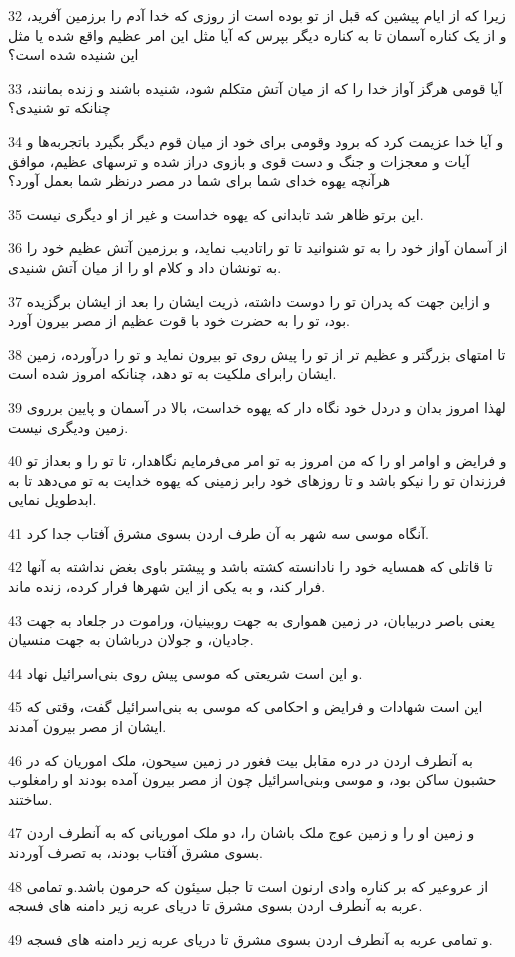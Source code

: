 \par 32 زیرا که از ایام پیشین که قبل از تو بوده است از روزی که خدا آدم را برزمین آفرید، و از یک کناره آسمان تا به کناره دیگر بپرس که آیا مثل این امر عظیم واقع شده یا مثل این شنیده شده است؟
\par 33 آیا قومی هرگز آواز خدا را که از میان آتش متکلم شود، شنیده باشند و زنده بمانند، چنانکه تو شنیدی؟
\par 34 و آیا خدا عزیمت کرد که برود وقومی برای خود از میان قوم دیگر بگیرد باتجربه‌ها و آیات و معجزات و جنگ و دست قوی و بازوی دراز شده و ترسهای عظیم، موافق هرآنچه یهوه خدای شما برای شما در مصر درنظر شما بعمل آورد؟
\par 35 این برتو ظاهر شد تابدانی که یهوه خداست و غیر از او دیگری نیست.
\par 36 از آسمان آواز خود را به تو شنوانید تا تو راتادیب نماید، و برزمین آتش عظیم خود را به تونشان داد و کلام او را از میان آتش شنیدی.
\par 37 و ازاین جهت که پدران تو را دوست داشته، ذریت ایشان را بعد از ایشان برگزیده بود، تو را به حضرت خود با قوت عظیم از مصر بیرون آورد.
\par 38 تا امتهای بزرگتر و عظیم تر از تو را پیش روی تو بیرون نماید و تو را درآورده، زمین ایشان رابرای ملکیت به تو دهد، چنانکه امروز شده است.
\par 39 لهذا امروز بدان و دردل خود نگاه دار که یهوه خداست، بالا در آسمان و پایین برروی زمین ودیگری نیست.
\par 40 و فرایض و اوامر او را که من امروز به تو امر می‌فرمایم نگاهدار، تا تو را و بعداز تو فرزندان تو را نیکو باشد و تا روزهای خود رابر زمینی که یهوه خدایت به تو می‌دهد تا به ابدطویل نمایی.
\par 41 آنگاه موسی سه شهر به آن طرف اردن بسوی مشرق آفتاب جدا کرد.
\par 42 تا قاتلی که همسایه خود را نادانسته کشته باشد و پیشتر باوی بغض نداشته به آنها فرار کند، و به یکی از این شهرها فرار کرده، زنده ماند.
\par 43 یعنی باصر دربیابان، در زمین همواری به جهت روبینیان، وراموت در جلعاد به جهت جادیان، و جولان درباشان به جهت منسیان.
\par 44 و این است شریعتی که موسی پیش روی بنی‌اسرائیل نهاد.
\par 45 این است شهادات و فرایض و احکامی که موسی به بنی‌اسرائیل گفت، وقتی که ایشان از مصر بیرون آمدند.
\par 46 به آنطرف اردن در دره مقابل بیت فغور در زمین سیحون، ملک اموریان که در حشبون ساکن بود، و موسی وبنی‌اسرائیل چون از مصر بیرون آمده بودند او رامغلوب ساختند.
\par 47 و زمین او را و زمین عوج ملک باشان را، دو ملک اموریانی که به آنطرف اردن بسوی مشرق آفتاب بودند، به تصرف آوردند. 
\par 48 از عروعیر که بر کناره وادی ارنون است تا جبل سیئون که حرمون باشد.و تمامی عربه به آنطرف اردن بسوی مشرق تا دریای عربه زیر دامنه های فسجه.
\par 49 و تمامی عربه به آنطرف اردن بسوی مشرق تا دریای عربه زیر دامنه های فسجه.
 
